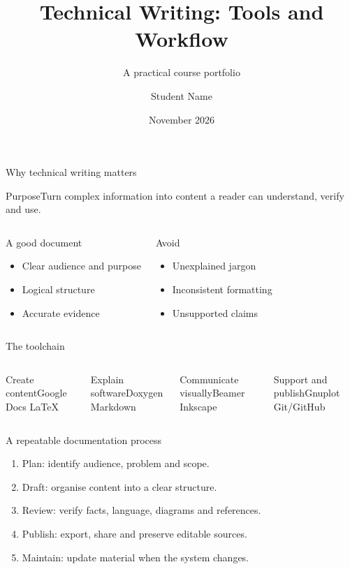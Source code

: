 \documentclass[aspectratio=169,11pt]{beamer}
\title[Technical Writing]{Technical Writing: Tools and Workflow}
\subtitle{A practical course portfolio}
\author{Student Name}
\institute{Department of Computer Science and Engineering}
\date{November 2026}
\begin{document}
\begin{frame}\titlepage\end{frame}
\begin{frame}{Why technical writing matters}
\begin{block}{Purpose}Turn complex information into content a reader can understand, verify and use.\end{block}
\begin{columns}[T,onlytextwidth]
\begin{exampleblock}{A good document}\begin{itemize}\item Clear audience and purpose\item Logical structure\item Accurate evidence\end{itemize}\end{exampleblock}
\begin{alertblock}{Avoid}\begin{itemize}\item Unexplained jargon\item Inconsistent formatting\item Unsupported claims\end{itemize}\end{alertblock}
\end{columns}
\end{frame}
\begin{frame}{The toolchain}
\begin{columns}[T,onlytextwidth]
\begin{block}{Create content}Google Docs \qquad LaTeX\end{block}
\begin{block}{Explain software}Doxygen \qquad Markdown\end{block}
\begin{block}{Communicate visually}Beamer \qquad Inkscape\end{block}
\begin{block}{Support and publish}Gnuplot \qquad Git/GitHub\end{block}
\end{columns}
\end{frame}
\begin{frame}{A repeatable documentation process}
\begin{enumerate}
\item Plan: identify audience, problem and scope.
\item Draft: organise content into a clear structure.
\item Review: verify facts, language, diagrams and references.
\item Publish: export, share and preserve editable sources.
\item Maintain: update material when the system changes.
\end{enumerate}
\end{frame}
\end{document}
